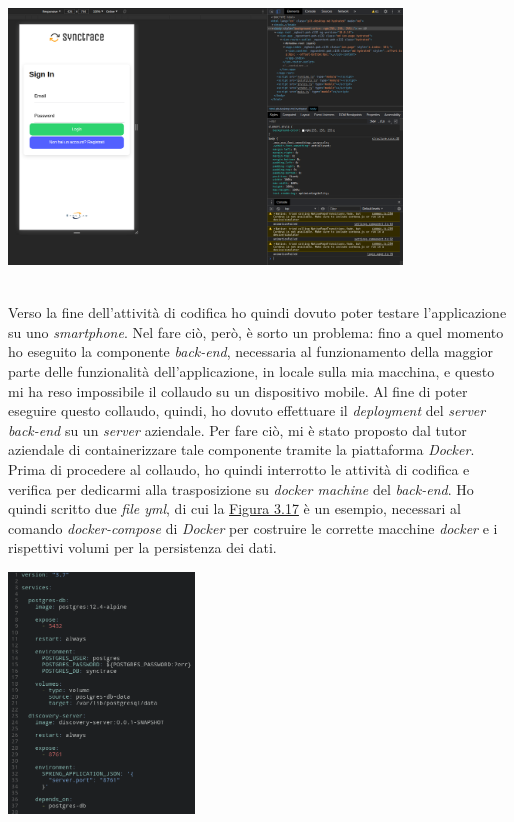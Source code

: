 \begin{minipage}{\linewidth}
  \label{img:ionicserve}
  \centering
    \includegraphics[height=6.8cm]{immagini/ionicserve}
\end{minipage} \\


Verso la fine dell'attività di codifica ho quindi dovuto poter testare l'applicazione su uno \textit{smartphone}. Nel fare ciò, però, è sorto un problema: fino a quel momento ho eseguito la componente \textit{back-end}, necessaria al funzionamento della maggior parte delle funzionalità dell'applicazione, in locale sulla mia macchina, e questo mi ha reso impossibile il collaudo su un dispositivo mobile. Al fine di poter eseguire questo collaudo, quindi, ho dovuto effettuare il \textit{deployment} del \textit{server} \textit{back-end} su un \textit{server} aziendale. Per fare ciò, mi è stato proposto dal tutor aziendale di containerizzare tale componente tramite la piattaforma \textit{Docker}. Prima di procedere al collaudo, ho quindi interrotto le attività di codifica e verifica per dedicarmi alla trasposizione su \textit{docker machine} del \textit{back-end}. Ho quindi scritto due \textit{file yml}, di cui la \hyperref[img:dockeryml]{Figura 3.17} è un esempio, necessari al comando \textit{docker-compose} di \textit{Docker} per costruire le corrette macchine \textit{docker} e i rispettivi volumi per la persistenza dei dati. \\

\begin{minipage}{\linewidth}
  \label{img:dockeryml}
  \centering
    \includegraphics[height=6.4cm]{immagini/dockeryml}
\end{minipage} \\

